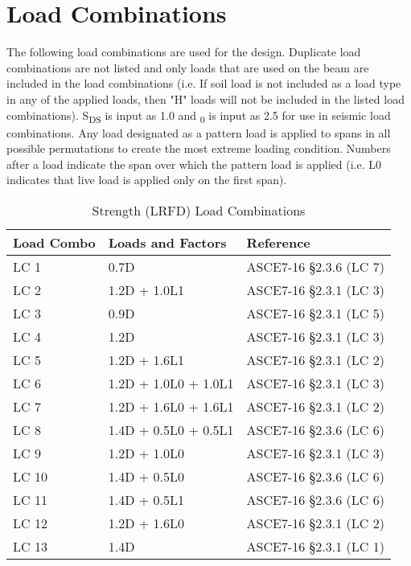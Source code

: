 \documentclass[12pt, fleqn]{article}
\begin{document}
\section{Load Combinations}
The following load combinations are used for the design. Duplicate load combinations are not listed and only loads that are used on the beam are included in the load combinations (i.e. If soil load is not included as a load type in any of the applied loads, then "H" loads will not be included in the listed load combinations). S\textsubscript{DS} is input as 1.0 and \textOmega\textsubscript{0} is input as 2.5 for use in seismic load combinations. Any load designated as a pattern load is applied to spans in all possible permutations to create the most extreme loading condition. Numbers after a load indicate the span over which the pattern load is applied (i.e. L0 indicates that live load is applied only on the first span).
\begin{table}[H]
\caption{Strength (LRFD) Load Combinations}
\centering
\begin{tabular}{l l l}
\hline
Load Combo & Loads and Factors & Reference\\
\hline
LC 1 & 0.7D & ASCE7-16 \S2.3.6 (LC 7)\\
LC 2 & 1.2D + 1.0L1 & ASCE7-16 \S2.3.1 (LC 3)\\
LC 3 & 0.9D & ASCE7-16 \S2.3.1 (LC 5)\\
LC 4 & 1.2D & ASCE7-16 \S2.3.1 (LC 3)\\
LC 5 & 1.2D + 1.6L1 & ASCE7-16 \S2.3.1 (LC 2)\\
LC 6 & 1.2D + 1.0L0 + 1.0L1 & ASCE7-16 \S2.3.1 (LC 3)\\
LC 7 & 1.2D + 1.6L0 + 1.6L1 & ASCE7-16 \S2.3.1 (LC 2)\\
LC 8 & 1.4D + 0.5L0 + 0.5L1 & ASCE7-16 \S2.3.6 (LC 6)\\
LC 9 & 1.2D + 1.0L0 & ASCE7-16 \S2.3.1 (LC 3)\\
LC 10 & 1.4D + 0.5L0 & ASCE7-16 \S2.3.6 (LC 6)\\
LC 11 & 1.4D + 0.5L1 & ASCE7-16 \S2.3.6 (LC 6)\\
LC 12 & 1.2D + 1.6L0 & ASCE7-16 \S2.3.1 (LC 2)\\
LC 13 & 1.4D & ASCE7-16 \S2.3.1 (LC 1)\\
\hline
\end{tabular}
\end{table}
\end{document}
